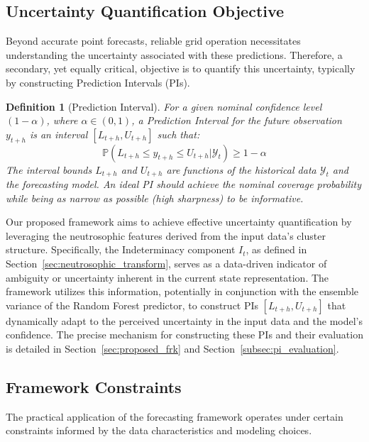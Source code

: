 \documentclass[review,3p,times]{elsarticle}
\newtheorem{definition}{Definition}[section]
\begin{document}
\subsection{Uncertainty Quantification Objective}

Beyond accurate point forecasts, reliable grid operation necessitates understanding the uncertainty associated with these predictions. Therefore, a secondary, yet equally critical, objective is to quantify this uncertainty, typically by constructing Prediction Intervals (PIs).

\begin{definition}[Prediction Interval]
For a given nominal confidence level $(1-\alpha)$, where $\alpha \in (0,1)$, a Prediction Interval for the future observation $y_{t+h}$ is an interval $[L_{t+h}, U_{t+h}]$ such that:
\begin{equation}
    \mathbb{P}(L_{t+h} \leq y_{t+h} \leq U_{t+h} | \mathcal{Y}_t) \geq 1-\alpha
\end{equation}
The interval bounds $L_{t+h}$ and $U_{t+h}$ are functions of the historical data $\mathcal{Y}_t$ and the forecasting model. An ideal PI should achieve the nominal coverage probability while being as narrow as possible (high sharpness) to be informative.
\end{definition}

Our proposed framework aims to achieve effective uncertainty quantification by leveraging the neutrosophic features derived from the input data's cluster structure. Specifically, the Indeterminacy component $I_t$, as defined in Section~\ref{sec:neutrosophic_transform}, serves as a data-driven indicator of ambiguity or uncertainty inherent in the current state representation. The framework utilizes this information, potentially in conjunction with the ensemble variance of the Random Forest predictor, to construct PIs $[L_{t+h}, U_{t+h}]$ that dynamically adapt to the perceived uncertainty in the input data and the model's confidence. The precise mechanism for constructing these PIs and their evaluation is detailed in Section~\ref{sec:proposed_frk} and Section~\ref{subsec:pi_evaluation}.

\subsection{Framework Constraints}

The practical application of the forecasting framework operates under certain constraints informed by the data characteristics and modeling choices.
\end{document}
